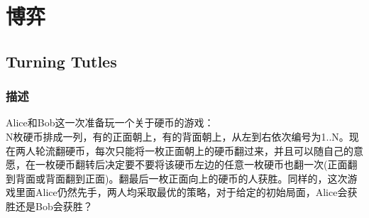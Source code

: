 %
%
	\newpage
	\section{博弈}
	\subsection{Turning Tutles}
	\subsubsection{描述}
	Alice和Bob这一次准备玩一个关于硬币的游戏：\\
	N枚硬币排成一列，有的正面朝上，有的背面朝上，从左到右依次编号为1..N。现在两人轮流翻硬币，每次只能将一枚正面朝上的硬币翻过来，并且可以随自己的意愿，在一枚硬币翻转后决定要不要将该硬币左边的任意一枚硬币也翻一次(正面翻到背面或背面翻到正面)。翻最后一枚正面向上的硬币的人获胜。同样的，这次游戏里面Alice仍然先手，两人均采取最优的策略，对于给定的初始局面，Alice会获胜还是Bob会获胜？
